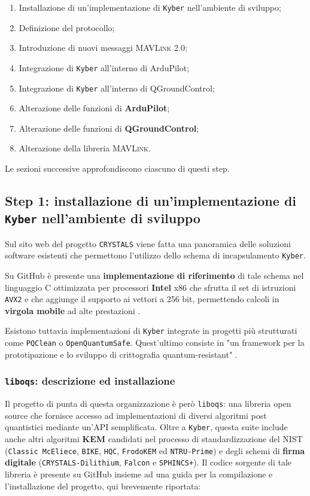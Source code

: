 \documentclass[a4paper, 12pt, oneside]{article}
\theoremstyle{definition}
\begin{document}
\begin{enumerate}
    \item Installazione di un'implementazione di \texttt{Kyber} nell'ambiente di sviluppo;
    \item Definizione del protocollo;
    \item Introduzione di nuovi messaggi \textsc{MAVLink} 2.0;
    \item Integrazione di \texttt{Kyber} all'interno di ArduPilot;
    \item Integrazione di \texttt{Kyber} all'interno di QGroundControl;
    \item Alterazione delle funzioni di \textbf{ArduPilot};
    \item Alterazione delle funzioni di \textbf{QGroundControl};
    \item Alterazione della libreria \textsc{MAVLink}.
\end{enumerate}

Le sezioni successive approfondiscono ciascuno di questi step.

\subsection{Step 1: installazione di un'implementazione di \texttt{Kyber} nell'ambiente di sviluppo}
Sul sito web del progetto \texttt{CRYSTALS} \cite{crystals-software} viene fatta una panoramica delle soluzioni software esistenti che permettono l'utilizzo dello schema di incapsulamento \texttt{Kyber}.

Su GitHub è presente una \textbf{implementazione di riferimento} \cite{kyber-reference} di tale schema nel linguaggio C ottimizzata per processori \textbf{Intel} x86 che sfrutta il set di istruzioni \texttt{AVX2} e che aggiunge il supporto ai vettori a 256 bit, permettendo calcoli in \textbf{virgola mobile} ad alte prestazioni \cite{intel-avx2}.

Esistono tuttavia implementazioni di \texttt{Kyber} integrate in progetti più strutturati come \texttt{PQClean} o \texttt{OpenQuantumSafe}. Quest'ultimo consiste in "un framework per la prototipazione e lo sviluppo di crittografia quantum-resistant" \cite{oqs}.

\subsubsection{\texttt{liboqs}: descrizione ed installazione}
Il progetto di punta di questa organizzazione è però \texttt{liboqs}: una libreria open source che fornisce accesso ad implementazioni di diversi algoritmi post quantistici mediante un'API semplificata. Oltre a \texttt{Kyber}, questa suite include anche altri algoritmi \cite{liboqs-algorithms} \textbf{KEM} candidati nel processo di standardizzazione del NIST (\texttt{Classic McEliece}, \texttt{BIKE}, \texttt{HQC}, \texttt{FrodoKEM} ed \texttt{NTRU-Prime}) e degli schemi di \textbf{firma digitale} (\texttt{CRYSTALS-Dilithium}, \texttt{Falcon} e \texttt{SPHINCS+}). Il codice sorgente di tale libreria è presente su GitHub \cite{liboqs-github} insieme ad una guida per la compilazione e l'installazione del progetto, qui brevemente riportata:
\end{document}
